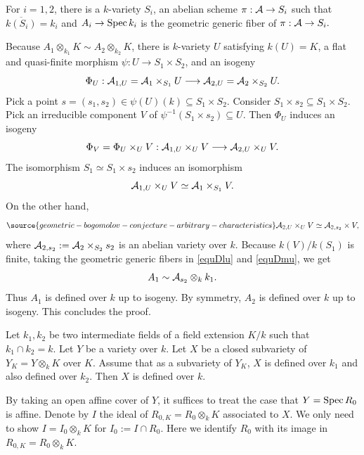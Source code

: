 For $i=1,2$, there is a $k$-variety $S_i$, an abelian scheme $\pi:{\mathcal A}\to S_i$ such that $\overline{k(S_i)}=k_i$ and $A_i\to {\rm Spec \,} k_i$ is the geometric generic fiber of $\pi:{\mathcal A}\to S_i.$

Because $A_1\otimes_{k_1}K\sim A_2\otimes_{k_2}K$, there is $k$-variety $U$ satisfying $k(U)=K$, a flat and quasi-finite morphism $\psi: U\to S_1\times S_2$, and an isogeny
$$\Phi_U:{\mathcal A}_{1,U}={\mathcal A}_1\times_{S_1} U\longrightarrow {\mathcal A}_{2,U}={\mathcal A}_2\times_{S_2} U.$$
Pick a point $s=(s_1,s_2)\in \psi(U)(k)\subseteq S_1\times S_2.$
Consider $S_1\times s_2 \subseteq S_1\times S_2.$
Pick an irreducible component $V$  of $\psi^{-1}(S_1\times s_2)\subseteq U.$
Then $\Phi_U$ induces an isogeny
$$\Phi_V=\Phi_U\times_UV: {\mathcal A}_{1,U}\times_UV\longrightarrow {\mathcal A}_{2,U}\times_UV.$$
The isomorphism $S_1\simeq S_1\times s_2$ induces an isomorphism
\begin{equation}\label{equDlu}{\mathcal A}_{1,U}\times_UV\simeq {\mathcal A}_1\times _{S_1} V.\end{equation}
On the other hand,
\begin{equation}\label{equDmu}
\source{geometric-bogomolov-conjecture-arbitrary-characteristics}
\sA_{2,U}\times_UV\simeq \sA_{2,s_2}\times V,\end{equation}
where ${\mathcal A}_{2,s_2}:={\mathcal A}_2\times_{S_2}s_2$ is an abelian variety over $k.$
Because $k(V)/k(S_1)$ is finite, taking the geometric generic fibers in \eqref{equDlu} and  \eqref{equDmu}, we get $$A_1\sim {\mathcal A}_{s_2}\otimes_kk_1.$$
Thus $A_1$ is defined over $k$ up to isogeny.
By symmetry, $A_2$ is defined over $k$ up to isogeny.
This concludes the proof.
\endproof










\begin{lem}
\notready\label{lemsubvardef}
Let $k_1, k_2$ be two intermediate fields of a field extension $K/k$ such that  $k_1\cap k_2=k$.
Let $Y$ be a variety over $k$. Let $X$ be a closed subvariety of $Y_K=Y\otimes_kK$ over $K$.
Assume that as a subvariety of $Y_K$, $X$ is defined over $k_1$ and also defined over $k_2$.
Then $X$ is defined over $k.$
\end{lem}

\proof
By taking an open affine cover of $Y$, it suffices to treat the case that $Y={\rm Spec \,} R_0$ is affine. Denote by $I$ the ideal of $R_{0,K}=R_0\otimes_kK$ associated to $X$.
We only need to show $I=I_0\otimes_kK$ for $I_0:=I\cap R_0.$ Here we identify $R_0$ with its image in $R_{0,K}=R_0\otimes_kK.$

